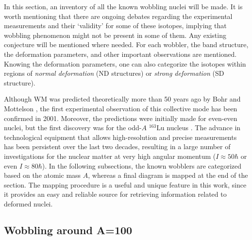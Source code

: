 In this section, an inventory of all the known wobbling nuclei will be made. It is worth mentioning that there are ongoing debates regarding the experimental measurements and their `validity' for some of these isotopes, implying that wobbling phenomenon might not be present in some of them. Any existing conjecture will be mentioned where needed. For each wobbler, the band structure, the deformation parameters, and other important observations are mentioned. Knowing the deformation parameters, one can also categorize the isotopes within regions of \emph{normal deformation} (ND structures) or \emph{strong deformation} (SD structure).

Although WM was predicted theoretically more than 50 years ago by Bohr and Mottelson \cite{bohr1998nuclear}, the first experimental observation of this collective mode has been confirmed in 2001. Moreover, the predictions were initially made for even-even nuclei, but the first discovery was for the odd-$A$ $^{163}$Lu nucleus \cite{odegaard2001evidence}. The advance in technological equipment that allows high-resolution and precise measurements has been persistent over the last two decades, resulting in a large number of investigations for the nuclear matter at very high angular momentum ($I\approx 50\hbar$ or even $I\approx 80\hbar$). In the following subsections, the known wobblers are categorized based on the atomic mass $A$, whereas a final diagram is mapped at the end of the section. The mapping procedure is a useful and unique feature in this work, since it provides an easy and reliable source for retrieving information related to deformed nuclei.

\subsection{Wobbling around A=100}

